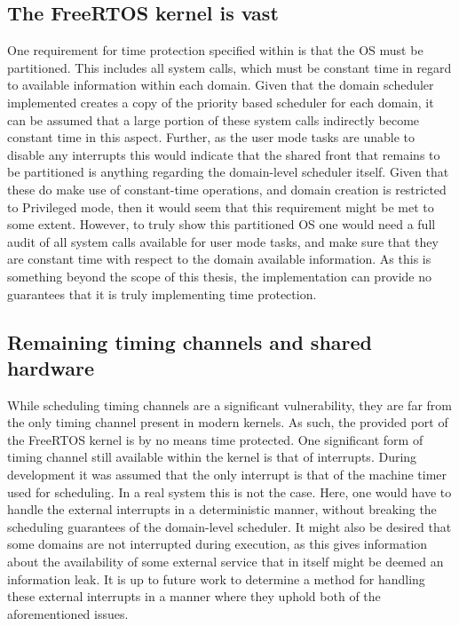 \subsection{The FreeRTOS kernel is vast}\label{sub:FreeRTOS-vast}
One requirement for time protection specified within \cite{ge2019} is that the
OS must be partitioned. This includes all system calls, which must be constant
time in regard to available information within each domain. Given that the
domain scheduler implemented creates a copy of the priority based scheduler for
each domain, it can be assumed that a large portion of these system calls
indirectly become constant time in this aspect. Further, as the user mode tasks
are unable to disable any interrupts this would indicate that the shared front
that remains to be partitioned is anything regarding the domain-level scheduler
itself. Given that these do make use of constant-time operations, and domain creation is
restricted to Privileged mode, then it would seem that this requirement might
be met to some extent. However, to truly show this partitioned OS one would
need a full audit of all system calls available for user mode tasks, and make
sure that they are constant time with respect to the domain available
information. As this is something beyond the scope of this thesis, the
implementation can provide no guarantees that it is truly implementing time
protection.

\subsection{Remaining timing channels and shared hardware}\label{sub:remaining-channels}
While scheduling timing channels are a significant vulnerability, they are far
from the only timing channel present in modern kernels. As such, the provided
port of the FreeRTOS kernel is by no means time protected. One significant form
of timing channel still available within the kernel is that of interrupts.
During development it was assumed that the only interrupt is that of the
machine timer used for scheduling. In a real system this is not the case. Here,
one would have to handle the external interrupts in a deterministic manner,
without breaking the scheduling guarantees of the domain-level scheduler. It
might also be desired that some domains are not interrupted during execution,
as this gives information about the availability of some external service that
in itself might be deemed an information leak. It is up to future work to
determine a method for handling these external interrupts in a manner where
they uphold both of the aforementioned issues.

